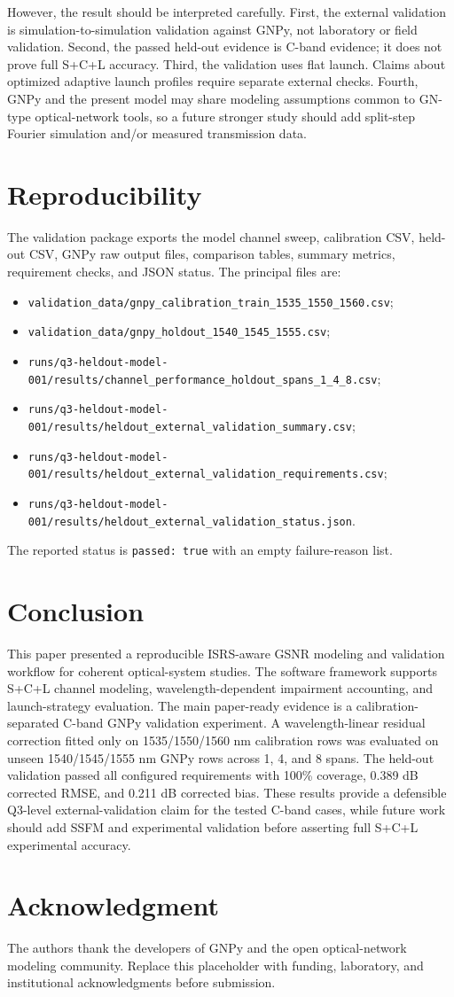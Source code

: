 \documentclass[conference]{IEEEtran}
\begin{document}
However, the result should be interpreted carefully. First, the external validation is simulation-to-simulation validation against GNPy, not laboratory or field validation. Second, the passed held-out evidence is C-band evidence; it does not prove full S+C+L accuracy. Third, the validation uses flat launch. Claims about optimized adaptive launch profiles require separate external checks. Fourth, GNPy and the present model may share modeling assumptions common to GN-type optical-network tools, so a future stronger study should add split-step Fourier simulation and/or measured transmission data.

\section{Reproducibility}
The validation package exports the model channel sweep, calibration CSV, held-out CSV, GNPy raw output files, comparison tables, summary metrics, requirement checks, and JSON status. The principal files are:
\begin{itemize}
    \item \texttt{validation\_data/gnpy\_calibration\_train\_1535\_1550\_1560.csv};
    \item \texttt{validation\_data/gnpy\_holdout\_1540\_1545\_1555.csv};
    \item \texttt{runs/q3-heldout-model-001/results/channel\_performance\_holdout\_spans\_1\_4\_8.csv};
    \item \texttt{runs/q3-heldout-model-001/results/heldout\_external\_validation\_summary.csv};
    \item \texttt{runs/q3-heldout-model-001/results/heldout\_external\_validation\_requirements.csv};
    \item \texttt{runs/q3-heldout-model-001/results/heldout\_external\_validation\_status.json}.
\end{itemize}
The reported status is \texttt{passed: true} with an empty failure-reason list.

\section{Conclusion}
This paper presented a reproducible ISRS-aware GSNR modeling and validation workflow for coherent optical-system studies. The software framework supports S+C+L channel modeling, wavelength-dependent impairment accounting, and launch-strategy evaluation. The main paper-ready evidence is a calibration-separated C-band GNPy validation experiment. A wavelength-linear residual correction fitted only on 1535/1550/1560 nm calibration rows was evaluated on unseen 1540/1545/1555 nm GNPy rows across 1, 4, and 8 spans. The held-out validation passed all configured requirements with 100\% coverage, 0.389 dB corrected RMSE, and 0.211 dB corrected bias. These results provide a defensible Q3-level external-validation claim for the tested C-band cases, while future work should add SSFM and experimental validation before asserting full S+C+L experimental accuracy.

\section*{Acknowledgment}
The authors thank the developers of GNPy and the open optical-network modeling community. Replace this placeholder with funding, laboratory, and institutional acknowledgments before submission.



\end{document}
